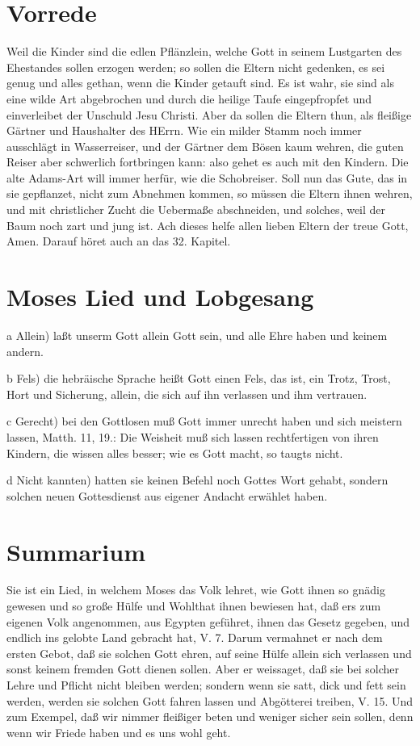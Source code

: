 \section{Vorrede}

Weil die Kinder sind die edlen Pflänzlein, welche Gott in seinem Lustgarten des Ehestandes sollen erzogen werden; so sollen die Eltern nicht gedenken, es sei genug und alles gethan, wenn die Kinder getauft sind. Es ist wahr, sie sind als eine wilde Art abgebrochen und durch die heilige Taufe eingepfropfet und einverleibet der Unschuld Jesu Christi. Aber da sollen die Eltern thun, als fleißige Gärtner und Haushalter des HErrn. Wie ein milder Stamm noch immer ausschlägt in Wasserreiser, und der Gärtner dem Bösen kaum wehren, die guten Reiser aber schwerlich fortbringen kann: also gehet es auch mit den Kindern. Die alte Adams-Art will immer herfür, wie die Schobreiser. Soll nun das Gute, das in sie gepflanzet, nicht zum Abnehmen kommen, so müssen die Eltern ihnen wehren, und mit christlicher Zucht die Uebermaße abschneiden, und solches, weil der Baum noch zart und jung ist. Ach dieses helfe allen lieben Eltern der treue Gott, Amen. Darauf höret auch an das 32. Kapitel.

\section{Moses Lied und Lobgesang}

a Allein) laßt unserm Gott allein Gott sein, und alle Ehre haben und keinem andern.

b Fels) die hebräische Sprache heißt Gott einen Fels, das ist, ein Trotz, Trost, Hort und Sicherung, allein, die sich auf ihn verlassen und ihm vertrauen.

c Gerecht) bei den Gottlosen muß Gott immer unrecht haben und sich meistern lassen, Matth. 11, 19.: Die Weisheit muß sich lassen rechtfertigen von ihren Kindern, die wissen alles besser; wie es Gott macht, so taugts nicht.

d Nicht kannten) hatten sie keinen Befehl noch Gottes Wort gehabt, sondern solchen neuen Gottesdienst aus eigener Andacht erwählet haben.

\section{Summarium}

Sie ist ein Lied, in welchem Moses das Volk lehret, wie Gott ihnen so gnädig gewesen und so große Hülfe und Wohlthat ihnen bewiesen hat, daß ers zum eigenen Volk angenommen, aus Egypten geführet, ihnen das Gesetz gegeben, und endlich ins gelobte Land gebracht hat, V. 7. Darum vermahnet er nach dem ersten Gebot, daß sie solchen Gott ehren, auf seine Hülfe allein sich verlassen und sonst keinem fremden Gott dienen sollen. Aber er weissaget, daß sie bei solcher Lehre und Pflicht nicht bleiben werden; sondern wenn sie satt, dick und fett sein werden, werden sie solchen Gott fahren lassen und Abgötterei treiben, V. 15. Und zum Exempel, daß wir nimmer fleißiger beten und weniger sicher sein sollen, denn wenn wir Friede haben und es uns wohl geht.

